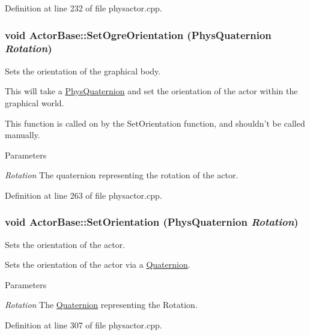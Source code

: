 Definition at line 232 of file physactor.cpp.

\hypertarget{classActorBase_a55f45703e3d9b8de0cd07b23bd9460bf}{
\subsubsection[{SetOgreOrientation}]{\setlength{\rightskip}{0pt plus 5cm}void ActorBase::SetOgreOrientation ({\bf PhysQuaternion} {\em Rotation})}}
\label{dd/d7b/classActorBase_a55f45703e3d9b8de0cd07b23bd9460bf}


Sets the orientation of the graphical body. 

This will take a \hyperlink{classPhysQuaternion}{PhysQuaternion} and set the orientation of the actor within the graphical world. \par
 This function is called on by the SetOrientation function, and shouldn't be called manually. 
\begin{DoxyParams}{Parameters}
\item[{\em Rotation}]The quaternion representing the rotation of the actor. \end{DoxyParams}


Definition at line 263 of file physactor.cpp.

\hypertarget{classActorBase_a5fe558ca0a88061615cda52a4dc5bf66}{
\subsubsection[{SetOrientation}]{\setlength{\rightskip}{0pt plus 5cm}void ActorBase::SetOrientation ({\bf PhysQuaternion} {\em Rotation})}}
\label{dd/d7b/classActorBase_a5fe558ca0a88061615cda52a4dc5bf66}


Sets the orientation of the actor. 

Sets the orientation of the actor via a \hyperlink{classQuaternion}{Quaternion}. 
\begin{DoxyParams}{Parameters}
\item[{\em Rotation}]The \hyperlink{classQuaternion}{Quaternion} representing the Rotation. \end{DoxyParams}


Definition at line 307 of file physactor.cpp.

